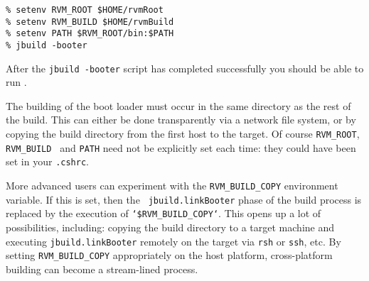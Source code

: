 \begin{verbatim}
% setenv RVM_ROOT $HOME/rvmRoot
% setenv RVM_BUILD $HOME/rvmBuild
% setenv PATH $RVM_ROOT/bin:$PATH
% jbuild -booter
\end{verbatim}

After the {\tt jbuild -booter} script has completed successfully you should be able 
to run \jp. 

The building of the boot loader must occur in the same directory as
the rest of the build.  This can either be done transparently via a
network file system, or by copying the build directory from the first
host to the target.  Of course {\tt RVM\_ROOT}, {\tt RVM\_BUILD }
and {\tt PATH} need not be explicitly set each time: they could have
been set in your {\tt .cshrc}.

More advanced users can experiment with the {\tt RVM\_BUILD\_COPY}
environment variable.  If this is set, then the {\tt
  jbuild.linkBooter} phase of the build process is replaced by the
execution of {\tt `\$RVM\_BUILD\_COPY`}.  This opens up a lot of
possibilities, including: copying the build directory to a target
machine and executing {\tt jbuild.linkBooter} remotely on the target
via {\tt rsh} or {\tt ssh}, etc.  By setting {\tt RVM\_BUILD\_COPY}
appropriately on the host platform, cross-platform building can become
a stream-lined process.









